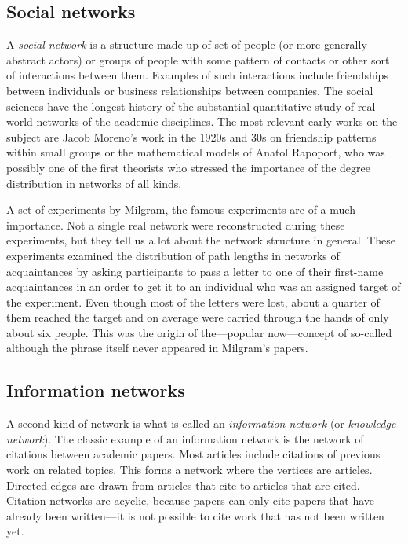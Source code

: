     \subsection{Social networks}

      A \emph{social network} is a structure made up of set of people (or more generally abstract actors) or groups of people with some pattern of contacts or other sort of interactions between them\cite{WassermanFaust1994}. Examples of such interactions include friendships between individuals or business relationships between companies. The social sciences have the longest history of the substantial quantitative study of real-world networks of the academic disciplines\cite{WassermanFaust1994}. The most relevant early works on the subject are Jacob Moreno's work in the 1920s and 30s on friendship patterns within small groups\cite{Moreno1934} or the mathematical models of Anatol Rapoport\cite{Rapoport1957}, who was possibly one of the first theorists who stressed the importance of the degree distribution in networks of all kinds.

      A set of experiments by Milgram, the famous  experiments\cite{Milgram1967} are of a much importance. Not a single real network were reconstructed during these experiments, but they tell us a lot about the network structure in general. These experiments examined the distribution of path lengths in networks of acquaintances by asking participants to pass a letter to one of their first-name acquaintances in an order to get it to an individual who was an assigned target of the experiment. Even though most of the letters were lost, about a quarter of them reached the target and on average were carried through the hands of only about six people. This was the origin of the---popular now---concept of so-called  although the phrase itself never appeared in Milgram's papers.

    \subsection{Information networks}

      A second kind of network is what is called an \emph{information network} (or \emph{knowledge network}). The classic example of an information network is the network of citations between academic papers\cite{Egghe1990}. Most articles include citations of previous work on related topics. This forms a network where the vertices are articles. Directed edges are drawn from articles that cite to articles that are cited. Citation networks are acyclic, because papers can only cite papers that have already been written---it is not possible to cite work that has not been written yet.

